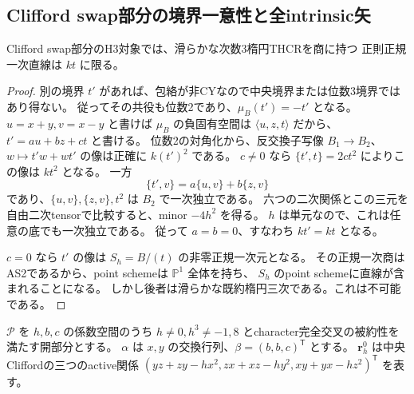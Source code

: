 \subsection{Clifford swap部分の境界一意性と全intrinsic矢}
\label{subsec:normal-order2-arrows}
\begin{lemma}
\label{lem:normal-order2-boundary-unique}
Clifford swap部分のH3対象では、滑らかな次数3楕円THCRを商に持つ
正則正規一次直線は $kt$ に限る。
\end{lemma}
\begin{proof}
別の境界 $t'$ があれば、包絡が非CYなので中央境界または位数3境界ではあり得ない。
従ってその共役も位数2であり、$\mu_B(t')=-t'$ となる。
$u=x+y,v=x-y$ と書けば $\mu_B$ の負固有空間は $\langle u,z,t\rangle$ だから、
$t'=au+bz+ct$ と書ける。
位数2の対角化から、反交換子写像
$B_1\to B_2$、$w\mapsto t'w+wt'$ の像は正確に $k(t')^2$ である。
$c\ne0$ なら $\{t',t\}=2ct^2$ によりこの像は $kt^2$ となる。
一方
\[
 \{t',v\}=a\{u,v\}+b\{z,v\}
\]
であり、$\{u,v\},\{z,v\},t^2$ は $B_2$ で一次独立である。
六つの二次関係とこの三元を自由二次tensorで比較すると、minor $-4h^2$ を得る。
$h$ は単元なので、これは任意の底でも一次独立である。
従って $a=b=0$、すなわち $kt'=kt$ となる。

$c=0$ なら $t'$ の像は $S_h=B/(t)$ の非零正規一次元となる。
その正規一次商はAS2であるから、point schemeは $\mathbb P^1$ 全体を持ち、
$S_h$ のpoint schemeに直線が含まれることになる。
しかし後者は滑らかな既約楕円三次である。これは不可能である。
\end{proof}

$\mathcal P$ を $h,b,c$ の係数空間のうち
$h\ne0,h^3\ne-1,8$ とcharacter完全交叉の被約性を満たす開部分とする。
$\alpha$ は $x,y$ の交換行列、$\beta=(b,b,c)^{\mathsf T}$ とする。
$\mathbf r_h^0$ は中央Cliffordの三つのactive関係
$(yz+zy-hx^2,zx+xz-hy^2,xy+yx-hz^2)^{\mathsf T}$ を表す。

